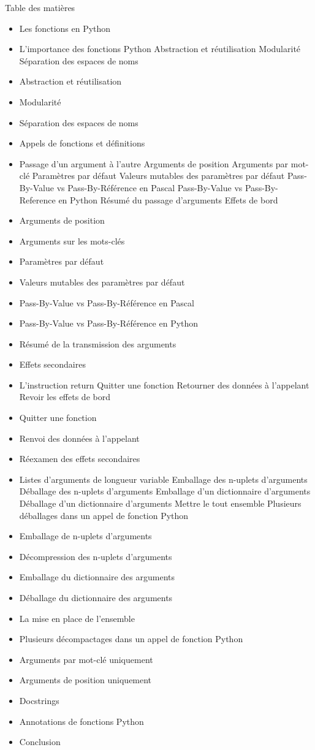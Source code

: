 Table des matières
\begin{itemize}
\item Les fonctions en Python
\item L'importance des fonctions Python
Abstraction et réutilisation
Modularité
Séparation des espaces de noms


\item Abstraction et réutilisation
\item Modularité
\item Séparation des espaces de noms
\item Appels de fonctions et définitions
\item Passage d'un argument à l'autre
Arguments de position
Arguments par mot-clé
Paramètres par défaut
Valeurs mutables des paramètres par défaut
Pass-By-Value vs Pass-By-Référence en Pascal
Pass-By-Value vs Pass-By-Reference en Python
Résumé du passage d'arguments
Effets de bord


\item Arguments de position
\item Arguments sur les mots-clés
\item Paramètres par défaut
\item Valeurs mutables des paramètres par défaut
\item Pass-By-Value vs Pass-By-Référence en Pascal
\item Pass-By-Value vs Pass-By-Référence en Python
\item Résumé de la transmission des arguments
\item Effets secondaires
\item L'instruction return
Quitter une fonction
Retourner des données à l'appelant
Revoir les effets de bord


\item Quitter une fonction
\item Renvoi des données à l'appelant
\item Réexamen des effets secondaires
\item Listes d'arguments de longueur variable
Emballage des n-uplets d'arguments
Déballage des n-uplets d'arguments
Emballage d'un dictionnaire d'arguments
Déballage d'un dictionnaire d'arguments
Mettre le tout ensemble
Plusieurs déballages dans un appel de fonction Python


\item Emballage de n-uplets d'arguments
\item Décompression des n-uplets d'arguments
\item Emballage du dictionnaire des arguments
\item Déballage du dictionnaire des arguments
\item La mise en place de l'ensemble
\item Plusieurs décompactages dans un appel de fonction Python
\item Arguments par mot-clé uniquement
\item Arguments de position uniquement
\item Docstrings
\item Annotations de fonctions Python
\item Conclusion
\end{itemize}
